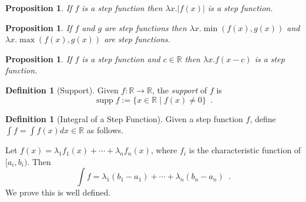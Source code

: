 \documentclass{book}
\newtheorem{prop}[ax]{Proposition}
\theoremstyle{definition}
\newtheorem{df}[ax]{Definition}
\newcommand{\supp}{\ensuremath{\operatorname{supp}}}
\begin{document}
\begin{prop}
If $f$ is a step function then $\lambda x. |f(x)|$ is a step function.
\end{prop}

\begin{prop}
If $f$ and $g$ are step functions then $\lambda x. \min(f(x),g(x))$ and $\lambda x.\max(f(x),g(x))$ are step functions.
\end{prop}

\begin{prop}
If $f$ is a step function and $c \in \mathbb{R}$ then $\lambda x. f(x-c)$ is a step function.
\end{prop}

\begin{df}[Support]
Given $f : \mathbb{R} \rightarrow \mathbb{R}$, the \emph{support} of $f$ is
\[ \supp f := \{ x \in \mathbb{R} \mid f(x) \neq 0 \} \enspace . \]
\end{df}

\begin{df}[Integral of a Step Function]
Given a step function $f$, define $\int f = \int f(x) dx \in \mathbb{R}$ as follows.

Let $f(x) = \lambda_1 f_1(x) + \cdots + \lambda_n f_n(x)$, where $f_i$ is the characteristic function of $[a_i,b_i)$. Then
\[ \int f = \lambda_1 (b_1 - a_1) + \cdots + \lambda_n (b_n - a_n) \enspace . \]
We prove this is well defined.
\end{df}
\end{document}
